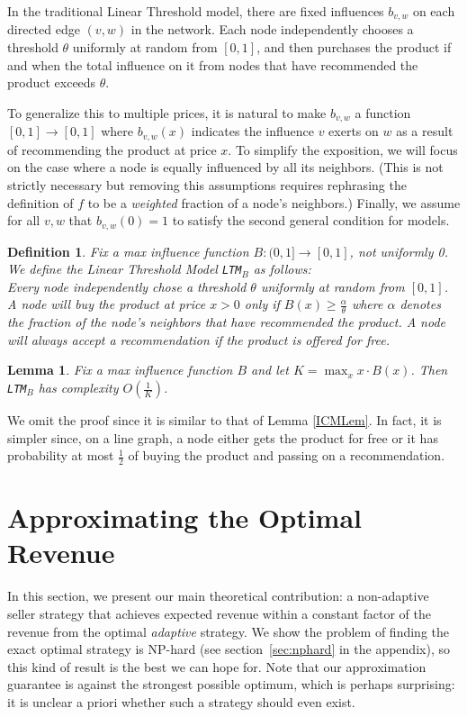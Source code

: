 \documentclass[letterpaper,twoside]{article}
\newtheorem{lemma}{Lemma}
\newtheorem{defn}{Definition}
\newcommand{\LTM}[1]{\texttt{LTM}$_{#1}$}
\begin{document}
In the traditional Linear Threshold model, there are fixed
influences $b_{v,w}$ on each directed edge $(v,w)$ in the
network. Each node independently chooses a threshold $\theta$
uniformly at random from $[0,1]$, and then purchases the product
if and when the total influence on it from nodes that have
recommended the product exceeds $\theta$.

To generalize this to multiple prices, it is natural to make
$b_{v,w}$ a function $[0,1]\rightarrow[0,1]$ where $b_{v,w}(x)$
indicates the influence $v$ exerts on $w$ as a result of
recommending the product at price $x$. To simplify the exposition,
we will focus on the case where a node is equally influenced by all
its neighbors. (This is not strictly necessary but removing this
assumptions requires rephrasing the definition of $f$ to be a
{\em weighted} fraction of a node's neighbors.) Finally, we assume
for all $v,w$ that $b_{v,w}(0) = 1$ to satisfy the second general
condition for models.

\begin{defn}
    Fix a max influence function $B: (0,1]\rightarrow[0,1]$, not
    uniformly 0. We define the {\em Linear Threshold Model} \LTM{B}
    as follows:\\
    Every node independently chose a threshold $\theta$ uniformly at
    random from $[0,1]$. A node will buy the product at price $x >
    0$ only if
    $B(x) \ge \frac{\alpha}{\theta}$ where $\alpha$ denotes the
    fraction of the node's neighbors that have recommended the
    product. A node will always accept a recommendation if the
    product is offered for free.
\end{defn}

\begin{lemma}
    Fix a max influence function $B$ and let
    $K = \max_x x \cdot B(x)$. Then \LTM{B} has complexity $O(\frac{1}{K})$.
\end{lemma}

We omit the proof since it is similar to that of Lemma \ref{ICMLem}.
In fact, it is simpler since, on a line graph, a node either gets
the product for free or it has probability at most $\frac{1}{2}$ of
buying the product and passing on a recommendation.

\section{Approximating the Optimal Revenue}
\label{sec:approxalg}
In this section, we present our main theoretical contribution: a non-adaptive
seller strategy that achieves expected revenue within a constant factor of
the revenue from the optimal {\em adaptive} strategy.  We show the problem of
finding the exact optimal strategy is NP-hard (see section~\ref{sec:nphard}
in the appendix), so this kind of result is the best we can hope for.  Note
that our approximation guarantee is against the strongest possible optimum,
which is perhaps surprising: it is unclear a priori whether such a strategy
should even exist.
\end{document}
